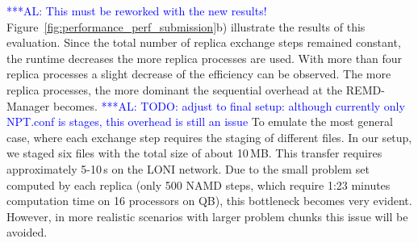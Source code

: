 \documentclass{rspublic}
\newcommand{\alnote}[1]{ {\textcolor{blue} { ***AL: #1 }}}
\newcommand{\jhanote}[1]{ {\textcolor{red} { ***SJ: #1 }}}
\newcommand{\alnote}[1]{}
\newcommand{\jhanote}[1]{}
\newcommand{\glidein}[1]{Glide-In }
\begin{document}

\alnote{This must be reworked with the new results!}
Figure~\ref{fig:performance_perf_submission}b) illustrate the results of
this evaluation. Since the total number of replica exchange steps
remained constant, the runtime decreases the more replica processes
are used.  With more than four replica processes a slight decrease of
the efficiency can be observed.
The more replica processes, the more dominant the sequential overhead
at the REMD-Manager becomes. 
\alnote{TODO: adjust to final setup: although currently only NPT.conf is
stages, this overhead is still an issue}
To emulate the most general case, where each exchange step requires the staging of
different files. In our setup, we staged six files with the total size
of about 10\,MB. This transfer requires approximately 5-10\,s
on the LONI network.  Due to the small problem set computed by each
replica (only 500 NAMD steps, which require 1:23 minutes computation
time on 16 processors on QB), this bottleneck becomes very evident. However, in more
realistic scenarios with larger problem chunks this issue will be
avoided.


   
\end{document}
